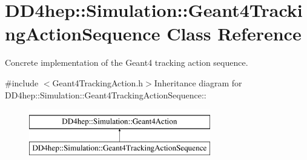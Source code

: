 \hypertarget{class_d_d4hep_1_1_simulation_1_1_geant4_tracking_action_sequence}{
\section{DD4hep::Simulation::Geant4TrackingActionSequence Class Reference}
\label{class_d_d4hep_1_1_simulation_1_1_geant4_tracking_action_sequence}
}


Concrete implementation of the Geant4 tracking action sequence.  


{\ttfamily \#include $<$Geant4TrackingAction.h$>$}Inheritance diagram for DD4hep::Simulation::Geant4TrackingActionSequence::\begin{figure}[H]
\begin{center}
\leavevmode
\includegraphics[height=2cm]{class_d_d4hep_1_1_simulation_1_1_geant4_tracking_action_sequence}
\end{center}
\end{figure}
